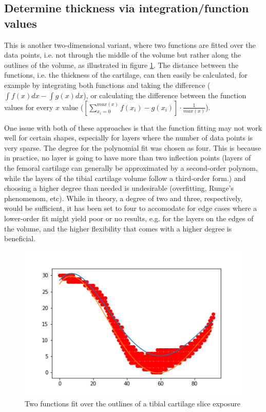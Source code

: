 \subsection{Determine thickness via integration/function values}
\label{sec:Integration}
This is another two-dimensional variant, where two functions are fitted over the data points, i.e. not through the middle of the volume but rather along the outlines of the volume, as illustrated in figure \ref{fig:integration}. The distance between the functions, i.e. the thickness of the cartilage, can then easily be calculated, for example by integrating both functions and taking the difference ($\int f(x) dx - \int g(x) dx$), or calculating the difference between the function values for every $x$ value ($[\sum_{x_i = 0}^{max(x)} f(x_i) - g(x_i)] \cdot \frac{1}{max(x)}$).
\par
One issue with both of these approaches is that the function fitting may not work well for certain shapes, especially for layers where the number of data points is very sparse.
The degree for the polynomial fit was chosen as four. This is because in practice, no layer is going to have more than two inflection points (layers of the femoral cartilage can generally be approximated by a second-order polynom, while the layers of the tibial cartilage volume follow a third-order form.) and choosing a higher degree than needed is undesirable (overfitting, Runge's phenomenom, etc). While in theory, a degree of two and three, respectively, would be sufficient, it has been set to four to accomodate for edge cases where a lower-order fit might yield poor or no results, e.g. for the layers on the edges of the volume, and the higher flexibility that comes with a higher degree is beneficial.
\begin{figure}[htb!]
	\centering
	\includegraphics[width=\linewidth]{./figures/integration}
	\caption{Two functions fit over the outlines of a tibial cartilage slice exposure}
	\label{fig:integration}
\end{figure}